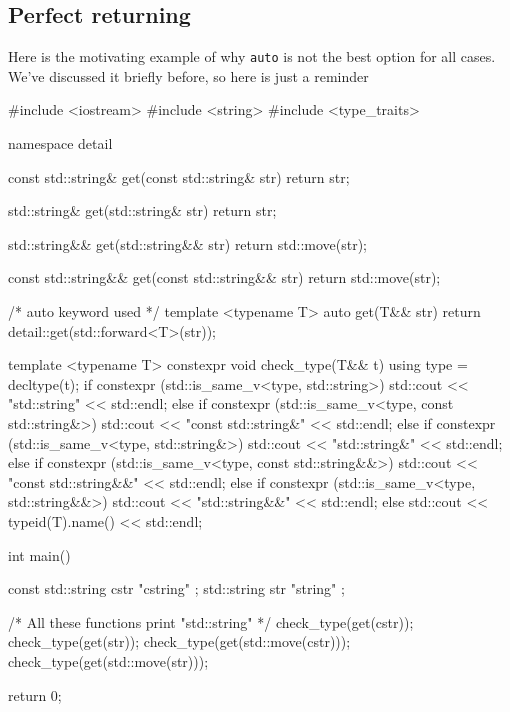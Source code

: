 \documentclass[../main]{subfiles}
\begin{document}
\subsection{Perfect returning}
\label{Perfect returning}
    Here is the motivating example of why \texttt{auto}
is not the best option for all cases. We've discussed it briefly before, 
so here is just a reminder
\begin{Code}
    #include <iostream>
    #include <string>
    #include <type_traits>
    
    namespace detail
    {
        const std::string& get(const std::string& str)
        {
            return str;
        }
        
        std::string& get(std::string& str)
        {
            return str;
        }
        
        std::string&& get(std::string&& str)
        {
            return std::move(str);
        }
        
        const std::string&& get(const std::string&& str)
        {
            return std::move(str);
        }
    }
    
    /* auto keyword used */
    template <typename T>
    auto get(T&& str)
    {
        return detail::get(std::forward<T>(str));
    }
    
    template <typename T>
    constexpr void check_type(T&& t)
    {
        using type = decltype(t);
        if constexpr (std::is_same_v<type, std::string>)
        {
            std::cout << "std::string" << std::endl;
        }
        else if constexpr (std::is_same_v<type, const std::string&>)
        {
            std::cout << "const std::string&" << std::endl;
        }
        else if constexpr (std::is_same_v<type, std::string&>)
        {
            std::cout << "std::string&" << std::endl;
        }
        else if constexpr (std::is_same_v<type, const std::string&&>)
        {
            std::cout << "const std::string&&" << std::endl;
        }
        else if constexpr (std::is_same_v<type, std::string&&>)
        {
            std::cout << "std::string&&" << std::endl;
        }
        else
        {
            std::cout << typeid(T).name() << std::endl;
        }
    }
    
    int main()
    {
        const std::string cstr { "cstring" };
        std::string str { "string" };
    
        /* All these functions print "std::string" */
        check_type(get(cstr));
        check_type(get(str));
        check_type(get(std::move(cstr)));
        check_type(get(std::move(str)));
    
        return 0;
    }
\end{Code}
\end{document}
